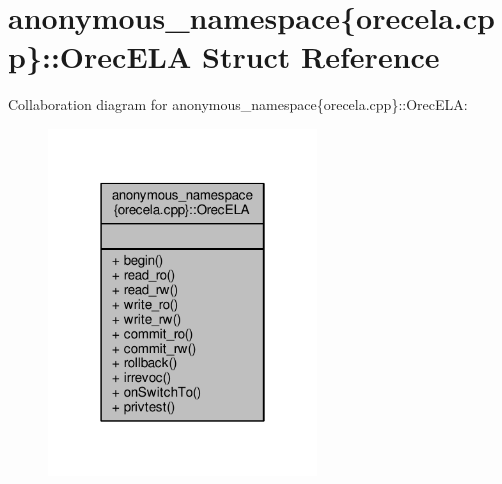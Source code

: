 \hypertarget{structanonymous__namespace_02orecela_8cpp_03_1_1OrecELA}{\section{anonymous\-\_\-namespace\{orecela.\-cpp\}\-:\-:Orec\-E\-L\-A Struct Reference}
\label{structanonymous__namespace_02orecela_8cpp_03_1_1OrecELA}
}


Collaboration diagram for anonymous\-\_\-namespace\{orecela.\-cpp\}\-:\-:Orec\-E\-L\-A\-:
\nopagebreak
\begin{figure}[H]
\begin{center}
\leavevmode
\includegraphics[width=202pt]{structanonymous__namespace_02orecela_8cpp_03_1_1OrecELA__coll__graph}
\end{center}
\end{figure}
